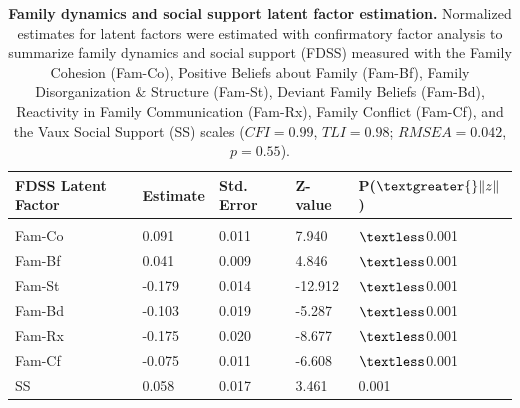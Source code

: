 \documentclass[utf8]{article}
\begin{document}
\begin{table}[h!]
\begin{tabular}{lllll}
FDSS Latent Factor & Estimate & Std. Error & Z-value & P($\textgreater{}\|z\|$) \\ \hline
                   &          &            &         &                          \\
Fam-Co             & 0.091    & 0.011      & 7.940   & $\textless$0.001                    \\
Fam-Bf             & 0.041    & 0.009      & 4.846   & $\textless$0.001                    \\
Fam-St             & -0.179   & 0.014      & -12.912 & $\textless$0.001                    \\
Fam-Bd             & -0.103   & 0.019      & -5.287  & $\textless$0.001                    \\
Fam-Rx             & -0.175   & 0.020      & -8.677  & $\textless$0.001                    \\
Fam-Cf             & -0.075   & 0.011      & -6.608  & $\textless$0.001                    \\
SS                 & 0.058    & 0.017      & 3.461   & 0.001                   
\end{tabular}
\caption{\textbf{Family dynamics and social support latent factor estimation.} Normalized estimates for latent factors were estimated with confirmatory factor analysis to summarize family dynamics and social support (FDSS) measured with the Family Cohesion (Fam-Co), Positive Beliefs about Family (Fam-Bf), Family Disorganization \& Structure (Fam-St), Deviant Family Beliefs (Fam-Bd), Reactivity in Family Communication (Fam-Rx), Family Conflict (Fam-Cf), and the Vaux Social Support (SS) scales ($CFI=0.99$, $TLI=0.98$; $RMSEA=0.042$, $p=0.55$).\label{tab:5}}
\end{table}
\end{document}

